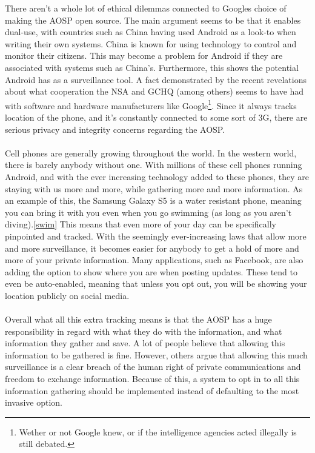\documentclass[conference]{IEEEtran}
\begin{document}
There aren't a whole lot of ethical dilemmas connected to Googles choice of making the AOSP open source. The main argument seems to be that it enables dual-use, with countries such as China having used Android as a look-to when writing their own systems\cite{country-license}. China is known for using technology to control and monitor their citizens. This may become a problem for Android if they are associated with systems such as China's. Furthermore, this shows the potential Android has as a surveillance tool. A fact demonstrated by the recent revelations about what cooperation the NSA and GCHQ (among others) seems to have had with software and hardware manufacturers like Google\footnote{Wether or not Google knew, or if the intelligence agencies acted illegally is still debated.}. Since it always tracks location of the phone, and it's constantly connected to some sort of 3G, there are serious privacy and integrity concerns regarding the AOSP. 
\\\\Cell phones are generally growing throughout the world. In the western world, there is barely anybody without one. With millions of these cell phones running Android, and with the ever increasing technology added to these phones, they are staying with us more and more, while gathering more and more information. As an example of this, the Samsung Galaxy S5 is a water resistant phone, meaning you can bring it with you even when you go swimming (as long as you aren't diving).\ref{swim} This means that even more of your day can be specifically pinpointed and tracked. With the seemingly ever-increasing laws that allow more and more surveillance, it becomes easier for anybody to get a hold of more and more of your private information.  Many applications, such as Facebook, are also adding the option to show where you are when posting updates. These tend to even be auto-enabled, meaning that unless you opt out, you will be showing your location publicly on social media. 
\\\\Overall what all this extra tracking means is that the AOSP has a huge responsibility in regard with what they do with the information, and what information they gather and save. A lot of people believe that allowing this information to be gathered is fine. However, others argue that allowing this much surveillance is a clear breach of the human right of private communications and freedom to exchange information. Because of this, a system to opt in to all this information gathering should be implemented instead of defaulting to the most invasive option. 
\end{document}
